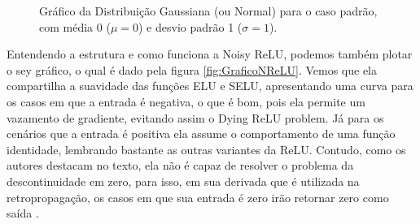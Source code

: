\begin{figure}[htbp]
    \centering
    \caption{Gráfico da Distribuição Gaussiana (ou Normal) para o caso padrão, com média 0 ($\mu = 0$) e desvio padrão 1 ($\sigma = 1$).}
    \label{fig:GraficoDistNormalPadrao}
\end{figure}

Entendendo a estrutura e como funciona a Noisy ReLU, podemos também plotar o sey gráfico, o qual é dado pela figura \ref{fig:GraficoNReLU}. Vemos que ela compartilha a suavidade das funções ELU e SELU, apresentando uma curva para os casos em que a entrada é negativa, o que é bom, pois ela permite um vazamento de gradiente, evitando assim o Dying ReLU problem. Já para os cenários que a entrada é positiva ela assume o comportamento de uma função identidade, lembrando bastante as outras variantes da ReLU. Contudo, como os autores destacam no texto, ela não é capaz de resolver o problema da descontinuidade em zero, para isso, em sua derivada que é utilizada na retropropagação, os casos em que sua entrada é zero irão retornar zero como saída \parencite{Nair2010}.


